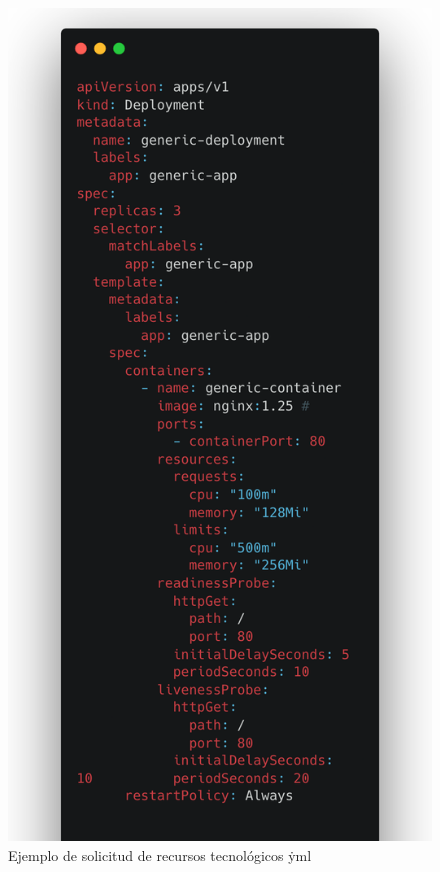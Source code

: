 \begin{figure}[H]
    \centering
    \includegraphics[scale=0.3]{apendices/ex-yml/yml-ex.png}
    \caption{Ejemplo de solicitud de recursos tecnológicos \.yml}\label{fig:ap-ejemplo-yml}
\end{figure}